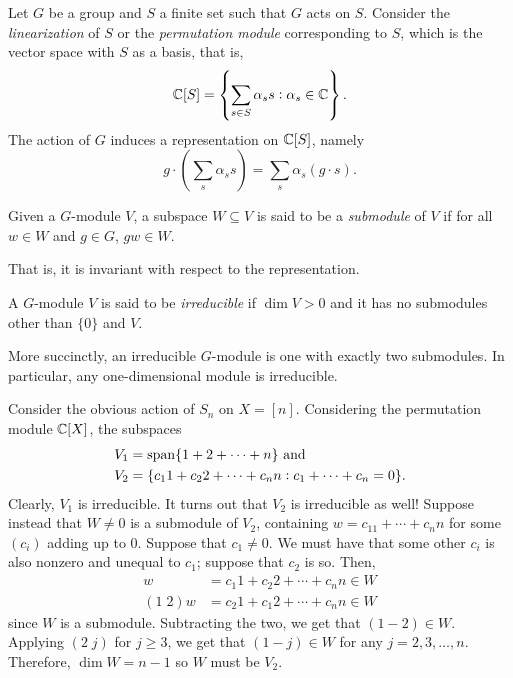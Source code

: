 	\begin{fex}
		Let $G$ be a group and $S$ a finite set such that $G$ acts on $S$. Consider the \emph{linearization} of $S$ or the \emph{permutation module} corresponding to $S$, which is the vector space with $S$ as a basis, that is,
		\[ \mathbb{C}[S] = \left\{ \sum_{s \in S} \alpha_s s : \alpha_s \in \mathbb{C} \right\}. \]
		The action of $G$ induces a representation on $\mathbb{C}[S]$, namely
		\[ g \cdot \left( \sum_s \alpha_s s \right) = \sum_s \alpha_s (g \cdot s). \] 
	\end{fex}

	\begin{fdef}
		Given a $G$-module $V$, a subspace $W \subseteq V$ is said to be a \emph{submodule} of $V$ if for all $w \in W$ and $g \in G$, $gw \in W$.
	\end{fdef}
	That is, it is invariant with respect to the representation.

	\begin{fdef}
		A $G$-module $V$ is said to be \emph{irreducible} if $\dim V > 0$ and it has no submodules other than $\{0\}$ and $V$.
	\end{fdef}
	More succinctly, an irreducible $G$-module is one with exactly two submodules. In particular, any one-dimensional module is irreducible.

	\begin{fex}
		\label{ex:sn-action-permutation-mod}
		Consider the obvious action of $S_n$ on $X = [n]$. Considering the permutation module $\mathbb{C}[X]$, the subspaces
		\begin{align*}
			V_1 &= \operatorname{span}\{1+2+\cdots+n\} \text{ and} \\
			V_2 &= \{c_11 + c_22 + \cdots + c_nn : c_1 + \cdots + c_n = 0\}.
		\end{align*}
		Clearly, $V_1$ is irreducible. It turns out that $V_2$ is irreducible as well! Suppose instead that $W \ne 0$ is a submodule of $V_2$, containing $w = c_11 + \cdots + c_nn$ for some $(c_i)$ adding up to $0$. Suppose that $c_1 \ne 0$. We must have that some other $c_i$ is also nonzero and unequal to $c_1$; suppose that $c_2$ is so. Then,
		\begin{align*}
			w &= c_1 1 + c_2 2 + \cdots + c_nn \in W \\
			(1\; 2) w &= c_2 1 + c_1 2 + \cdots + c_n n \in W
		\end{align*}
		since $W$ is a submodule. Subtracting the two, we get that $(1-2) \in W$. Applying $(2\; j)$ for $j \ge 3$, we get that $(1-j) \in W$ for any $j = 2,3,\ldots,n$. Therefore, $\dim W = n-1$ so $W$ must be $V_2$.
	\end{fex}

